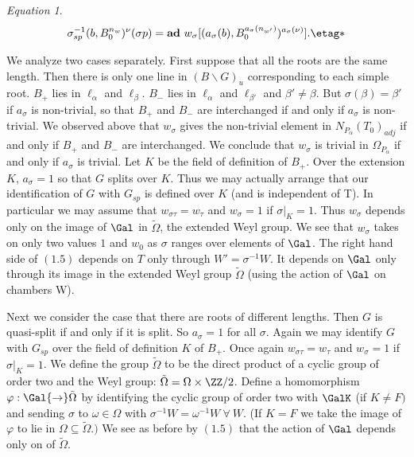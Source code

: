 \documentclass{memo-l}
\theoremstyle{definition}
\theoremstyle{remark}
\newtheorem{eqn}[theorem]{Equation}
\numberwithin{section}{chapter}
\numberwithin{equation}{chapter}
\begin{document}
\begin{eqn} %
$$
{\sigma}_{sp}^{-1}(b,B_{0}^{n_{w}})^{{\nu}} ({\sigma}p)  = 
{\bold {ad}}\ 
w_{{\sigma}}[(a_{{\sigma}}(b),B_{0}^{a_{{\sigma}}(n_{w'})})^{a_{{\sigma}}({\nu})}]. \etag *
$$
\end{eqn}

   We analyze two cases separately.  First suppose that all the roots are
the same length.  Then there is only one line in $(B\backslash G)_{u}$
corresponding to each simple root.  $B_{+}$ lies in ${\ell}_{{\alpha}}$ and
${\ell}_{{\beta}}$.  $B_{-}$ lies in ${\ell}_{{\alpha}}$ and
${\ell}_{{\beta}'}$ and ${\beta}'  \ne {\beta}$.  But
${\sigma}({\beta}) = {\beta}'$ if $a_{{\sigma}}$ is non-trivial, so that
$B_{+}$ and $B_{-}$ are interchanged if and only if $a_{{\sigma}}$ is
non-trivial.  We observed above that $w_{{\sigma}}$ gives the non-trivial
element in ${N}_{P_\alpha} (T_{0})_{adj}$ if and only if $B_{+}$ and $B_{-}$
are interchanged.  We conclude that $w_{{\sigma}}$ is trivial in
${\Omega}_{P_\alpha}$ if and only if $a_{{\sigma}}$ is trivial.  Let $K$ be
the field of definition of $B_{+}$.  Over the extension $K$, $a_{{\sigma}} = 1$
so that $G$ splits over $K$.  Thus we may actually arrange that our
identification of $G$ with $G_{sp}$ is defined over $K$ (and is independent
of T).  In particular we may assume that $w_{{\sigma}{\tau}} = w_{{\tau}}$
and $w_{{\sigma}} = 1$ if ${\sigma}\vert _{K}  =  1$.  Thus $w_{{\sigma}}$
depends only on the image of $\Gal$ in $\tilde {\Omega}$, the extended
Weyl group. We see
that $w_{{\sigma}}$ takes on only two values $1$ and $w_{0}$ as ${\sigma}$
ranges over elements of $\Gal$.  The right hand side of $(1.5)$
depends on $T$ only through $W'  =  {\sigma}^{-1}W$.  It depends on $\Gal$ 
only through its image in the extended Weyl group $\tilde {\Omega}$
(using the action of $\Gal$ on chambers W).

   Next we consider the case that there are roots of different lengths.
Then $G$ is quasi-split if and only if it is split.  So $a_{{\sigma}} = 1$
for all ${\sigma}$.  Again we may identify $G$ with $G_{sp}$ over the field
of definition $K$ of $B_{+}$.  Once again $w_{{\sigma}{\tau}} = w_{{\tau}}$
and $w_{{\sigma}} = 1$ if ${\sigma}\vert _{K}  =  1$.  We define the group
$\tilde {\Omega}$ to be the direct product of a cyclic group of order two
and the Weyl group: $\tilde {\Omega}  =  {\Omega} \times {\ZZ}/2$.
Define a homomorphism ${\varphi}: \Gal {\to} \tilde{\Omega}$ by
identifying the cyclic group of order two with $\GalK$ (if $K  \ne F)$ and
sending ${\sigma}$ to ${\omega}  \in  {\Omega}$ with ${\sigma}^{-1}W  = 
{\omega}^{-1}W {\ \forall\ } W$.  (If $K = F$ we take the image of
${\varphi}$ to lie in ${\Omega} {\subseteq} \tilde{\Omega} .)$ We see as
before by $(1.5)$ that the action of $\Gal$ depends only on
of $\tilde{\Omega} .$
\end{document}
